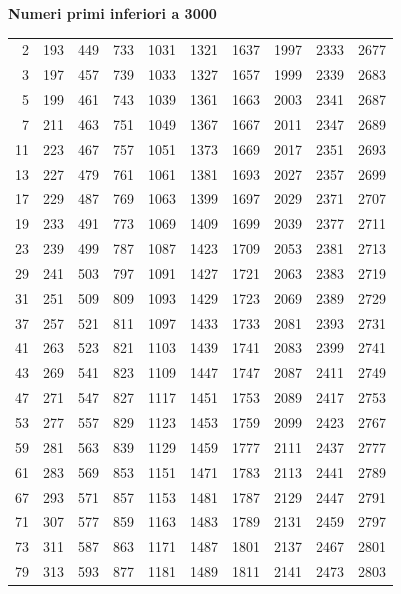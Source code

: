 \begin{center}
\textbf{Numeri primi inferiori a 3000}\\[6pt]
\scriptsize
\setlength{\tabcolsep}{4pt}
\renewcommand{\arraystretch}{1.0}
\begin{tabular}{*{10}{r}}
\toprule
2 & 193 & 449 & 733 & 1031 & 1321 & 1637 & 1997 & 2333 & 2677 \\
3 & 197 & 457 & 739 & 1033 & 1327 & 1657 & 1999 & 2339 & 2683 \\
5 & 199 & 461 & 743 & 1039 & 1361 & 1663 & 2003 & 2341 & 2687 \\
7 & 211 & 463 & 751 & 1049 & 1367 & 1667 & 2011 & 2347 & 2689 \\
11 & 223 & 467 & 757 & 1051 & 1373 & 1669 & 2017 & 2351 & 2693 \\
13 & 227 & 479 & 761 & 1061 & 1381 & 1693 & 2027 & 2357 & 2699 \\
17 & 229 & 487 & 769 & 1063 & 1399 & 1697 & 2029 & 2371 & 2707 \\
19 & 233 & 491 & 773 & 1069 & 1409 & 1699 & 2039 & 2377 & 2711 \\
23 & 239 & 499 & 787 & 1087 & 1423 & 1709 & 2053 & 2381 & 2713 \\
29 & 241 & 503 & 797 & 1091 & 1427 & 1721 & 2063 & 2383 & 2719 \\
31 & 251 & 509 & 809 & 1093 & 1429 & 1723 & 2069 & 2389 & 2729 \\
37 & 257 & 521 & 811 & 1097 & 1433 & 1733 & 2081 & 2393 & 2731 \\
41 & 263 & 523 & 821 & 1103 & 1439 & 1741 & 2083 & 2399 & 2741 \\
43 & 269 & 541 & 823 & 1109 & 1447 & 1747 & 2087 & 2411 & 2749 \\
47 & 271 & 547 & 827 & 1117 & 1451 & 1753 & 2089 & 2417 & 2753 \\
53 & 277 & 557 & 829 & 1123 & 1453 & 1759 & 2099 & 2423 & 2767 \\
59 & 281 & 563 & 839 & 1129 & 1459 & 1777 & 2111 & 2437 & 2777 \\
61 & 283 & 569 & 853 & 1151 & 1471 & 1783 & 2113 & 2441 & 2789 \\
67 & 293 & 571 & 857 & 1153 & 1481 & 1787 & 2129 & 2447 & 2791 \\
71 & 307 & 577 & 859 & 1163 & 1483 & 1789 & 2131 & 2459 & 2797 \\
73 & 311 & 587 & 863 & 1171 & 1487 & 1801 & 2137 & 2467 & 2801 \\
79 & 313 & 593 & 877 & 1181 & 1489 & 1811 & 2141 & 2473 & 2803 \\

\end{tabular}
\end{center}
